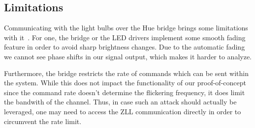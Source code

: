 \subsection{Limitations} %
\label{sec:exp:limitations}


Communicating with the light bulbs over the Hue bridge brings some limitations with it~\cite{Ronen:2016:EFAIDCSL}. For one, the bridge or the LED drivers implement some smooth fading feature in order to avoid sharp brightness changes. Due to the automatic fading we cannot see phase shifts in our signal output, which makes it harder to analyze.

Furthermore, the bridge restricts the rate of commands which can be sent within the system.
While this does not impact the functionality of our proof-of-concept since the command rate doesn't determine the flickering frequency, it does limit the bandwith of the channel.
Thus, in case such an attack should actually be leveraged, one may need to access the ZLL communication directly in order to circumvent the rate limit.

